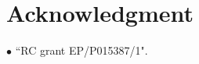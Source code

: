 \documentclass[conference]{IEEEtran}
\begin{document}
\section*{Acknowledgment}
	$\bullet$ ``RC grant EP/P015387/1".

%
%




 
\end{document}
